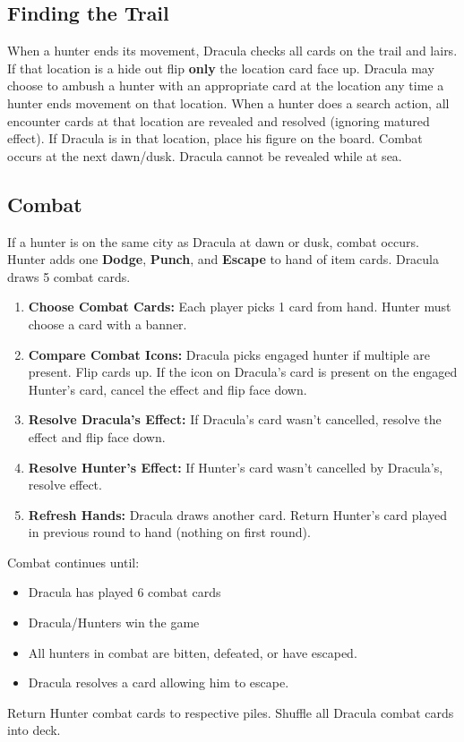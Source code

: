 \documentclass[12pt]{article}
\newenvironment{enumerateCustom}
{\begin{enumerate}
  \setlength{\itemsep}{1pt}
  \setlength{\parskip}{0pt}
  \setlength{\parsep}{0pt}}
{\end{enumerate}}
\newenvironment{itemizeCustom}
{\begin{itemize}
  \setlength{\itemsep}{1pt}
  \setlength{\parskip}{0pt}
  \setlength{\parsep}{0pt}}
{\end{itemize}}
\begin{document}
\begin{multicols*}{2}
\subsection*{Finding the Trail}
When a hunter ends its movement, Dracula checks all cards on the trail and lairs. If that location is a hide out flip \textbf{only} the location card face up. Dracula may choose to ambush a hunter with an appropriate card at the location any time a hunter ends movement on that location. When a hunter does a search action, all encounter cards at that location are revealed and resolved (ignoring matured effect). If Dracula is in that location, place his figure on the board. Combat occurs at the next dawn/dusk. Dracula cannot be revealed while at sea.

\subsection*{Combat}
If a hunter is on the same city as Dracula at dawn or dusk, combat occurs. Hunter adds one \textbf{Dodge}, \textbf{Punch}, and \textbf{Escape} to hand of item cards. Dracula draws 5 combat cards.

\begin{enumerateCustom}
    \item \textbf{Choose Combat Cards:} Each player picks 1 card from hand. Hunter must choose a card with a banner.
    \item \textbf{Compare Combat Icons:} Dracula picks engaged hunter if multiple are present. Flip cards up. If the icon on Dracula's card is present on the engaged Hunter's card, cancel the effect and flip face down.
    \item \textbf{Resolve Dracula's Effect:} If Dracula's card wasn't cancelled, resolve the effect and flip face down.
    \item \textbf{Resolve Hunter's Effect: }If Hunter's card wasn't cancelled by Dracula's, resolve effect.
    \item \textbf{Refresh Hands:} Dracula draws another card. Return Hunter's card played in previous round to hand (nothing on first round).
\end{enumerateCustom}

Combat continues until:
\begin{itemizeCustom}
    \item Dracula has played 6 combat cards
    \item Dracula/Hunters win the game
    \item All hunters in combat are bitten, defeated, or have escaped.
    \item Dracula resolves a card allowing him to escape.
\end{itemizeCustom}
Return Hunter combat cards to respective piles. Shuffle all Dracula combat cards into deck.


\end{multicols*}
\end{document}
